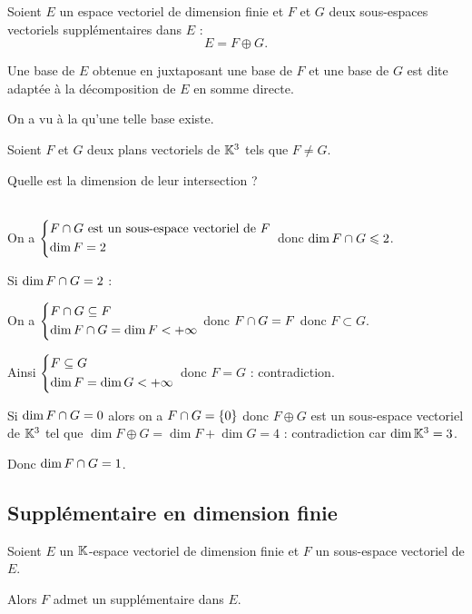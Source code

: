 \begin{defi}
Soient \(E\) un espace vectoriel de dimension finie et \(F\) et \(G\) deux sous-espaces vectoriels supplémentaires dans \(E\) : \[E=F\oplus G.\]

Une base de \(E\) obtenue en juxtaposant une base de \(F\) et une base de \(G\) est dite adaptée à la décomposition de \(E\) en somme directe.

On a vu à la  qu'une telle base existe.
\end{defi}

\begin{exo}
Soient \(F\) et \(G\) deux plans vectoriels de \(\mathbb{K}^3\) tels que \(F\not=G\).

Quelle est la dimension de leur intersection ?
\end{exo}

\begin{corr}~\\
On a \(\begin{dcases}
F\cap G\text{ est un sous-espace vectoriel de }F \\
\dim F=2
\end{dcases}\) donc \(\dim F\cap G\leqslant2\).

Si \(\dim F\cap G=2\) :

On a \(\begin{dcases}
F\cap G\subseteq F \\
\dim F\cap G=\dim F<+\infty
\end{dcases}\) donc \(F\cap G=F\) donc \(F\subset G\).

Ainsi \(\begin{dcases}
F\subseteq G \\
\dim F=\dim G<+\infty
\end{dcases}\) donc \(F=G\) : contradiction.

Si \(\dim F\cap G=0\) alors on a \(F\cap G=\left\lbrace0\right\rbrace\) donc \(F\oplus G\) est un sous-espace vectoriel de \(\mathbb{K}^3\) tel que \(\dim F\oplus G=\dim F+\dim G=4\) : contradiction car \(\dim\mathbb{K}^3=3\).

Donc \(\dim F\cap G=1\).
\end{corr}

\subsection{Supplémentaire en dimension finie}

\begin{theo}
Soient \(E\) un \(\mathbb{K}\)-espace vectoriel de dimension finie et \(F\) un sous-espace vectoriel de \(E\).

Alors \(F\) admet un supplémentaire dans \(E\).
\end{theo}

